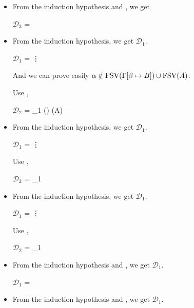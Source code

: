 \begin{itemize}
	\item \TTBL

	From the induction hypothesis and \TTBL, we get

	$\mathcal{D}_3$ = 
	{
	}

	\item \TGen

	From the induction hypothesis, we get $\mathcal{D}_1$.

	$\mathcal{D}_1$ = 
	{\vdots}

	And we can prove easily $\alpha \notin \text{FSV}(\Gamma[\beta \mapsto B]) \cup \text{FSV}(A)$.

	Use \TGen,

	$\mathcal{D}_2$ = 
	{_1 \andalso \alpha \notin \FTV(\GG) \cup \FTV(A)}

	\item \TIns

	From the induction hypothesis, we get $\mathcal{D}_1$.

	$\mathcal{D}_1$ = 
	{\vdots}

	Use \TIns,

	$\mathcal{D}_2$ = 
	{_1}

	\item \TCsp

	From the induction hypothesis, we get $\mathcal{D}_1$.

	$\mathcal{D}_1$ = 
	{\vdots}

	Use \TCsp,

	$\mathcal{D}_2$ = 
	{_1}

	\item \QKAbs

	From the induction hypothesis and \QKAbs, we get $\mathcal{D}_1$.

	$\mathcal{D}_1$ = 
	{ \andalso
		 }

	\item \QKCsp

	From the induction hypothesis and \QKCsp, we get $\mathcal{D}_1$.


\end{itemize}
